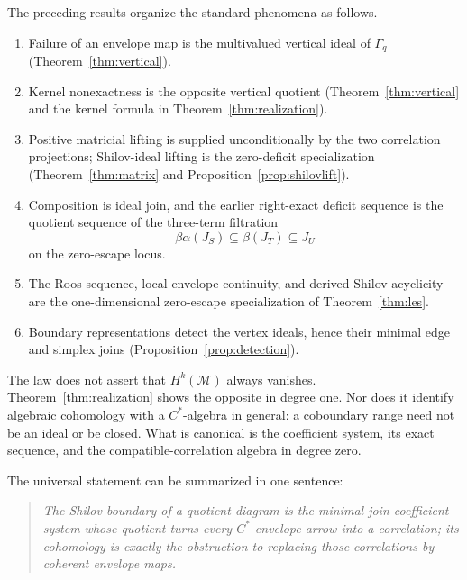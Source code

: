 \documentclass[11pt,a4paper]{amsart}
\theoremstyle{plain}
\theoremstyle{definition}
\begin{document}
The preceding results organize the standard phenomena as follows.

\begin{enumerate}[label=\textup{(\arabic*)}]
\item Failure of an envelope map is the multivalued vertical ideal of $\Gamma_q$
      (Theorem~\ref{thm:vertical}).
\item Kernel nonexactness is the opposite vertical quotient
      (Theorem~\ref{thm:vertical} and the kernel formula in
      Theorem~\ref{thm:realization}).
\item Positive matricial lifting is supplied unconditionally by the two correlation projections;
      Shilov-ideal lifting is the zero-deficit specialization
      (Theorem~\ref{thm:matrix} and Proposition~\ref{prop:shilovlift}).
\item Composition is ideal join, and the earlier right-exact deficit sequence is the quotient
      sequence of the three-term filtration
      \[
      \beta\alpha(J_S)\subseteq\beta(J_T)\subseteq J_U
      \]
      on the zero-escape locus.
\item The Roos sequence, local envelope continuity, and derived Shilov acyclicity are the
      one-dimensional zero-escape specialization of Theorem~\ref{thm:les}.
\item Boundary representations detect the vertex ideals, hence their minimal edge and simplex
      joins (Proposition~\ref{prop:detection}).
\end{enumerate}

The law does not assert that $H^k(\mathcal M)$ always vanishes.  Theorem~\ref{thm:realization}
shows the opposite in degree one.  Nor does it identify algebraic cohomology with a $C^*$-algebra
in general: a coboundary range need not be an ideal or be closed.  What is canonical is the
coefficient system, its exact sequence, and the compatible-correlation algebra in degree zero.

The universal statement can be summarized in one sentence:
\begin{quote}
\emph{The Shilov boundary of a quotient diagram is the minimal join coefficient system whose
quotient turns every $C^*$-envelope arrow into a correlation; its cohomology is exactly the
obstruction to replacing those correlations by coherent envelope maps.}
\end{quote}
\end{document}
